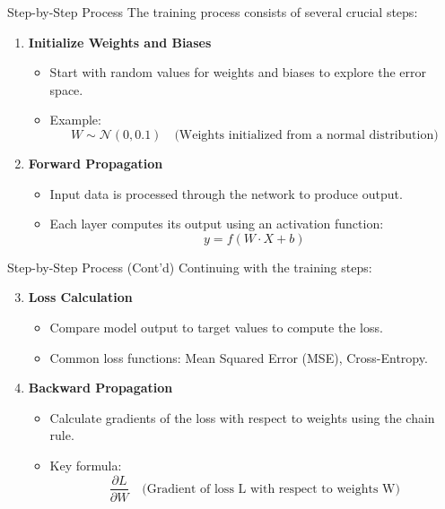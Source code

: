 \documentclass[aspectratio=169]{beamer}
\begin{document}
\begin{frame}{Step-by-Step Process}
    The training process consists of several crucial steps:

    \begin{enumerate}
        \item \textbf{Initialize Weights and Biases} 
            \begin{itemize}
                \item Start with random values for weights and biases to explore the error space.
                \item Example:
                    \begin{equation}
                        W \sim \mathcal{N}(0, 0.1) \quad \text{(Weights initialized from a normal distribution)}
                    \end{equation}
            \end{itemize}

        \item \textbf{Forward Propagation} 
            \begin{itemize}
                \item Input data is processed through the network to produce output.
                \item Each layer computes its output using an activation function:
                \begin{equation}
                    y = f(W \cdot X + b)
                \end{equation}
            \end{itemize}
    \end{enumerate}
\end{frame}

\begin{frame}{Step-by-Step Process (Cont'd)}
    Continuing with the training steps:

    \begin{enumerate}[resume]
        \setcounter{enumi}{2}
        \item \textbf{Loss Calculation}
            \begin{itemize}
                \item Compare model output to target values to compute the loss.
                \item Common loss functions: Mean Squared Error (MSE), Cross-Entropy.
            \end{itemize}

        \item \textbf{Backward Propagation}
            \begin{itemize}
                \item Calculate gradients of the loss with respect to weights using the chain rule.
                \item Key formula:
                \begin{equation}
                    \frac{\partial L}{\partial W} \quad \text{(Gradient of loss L with respect to weights W)}
                \end{equation}
            \end{itemize}
    \end{enumerate}
\end{frame}
\end{document}

